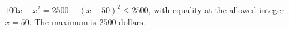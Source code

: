 $100x-x^2=2500-(x-50)^2\le2500$, with equality at the allowed integer $x=50$. The maximum is $\boxed{2500\text{ dollars}}$.

